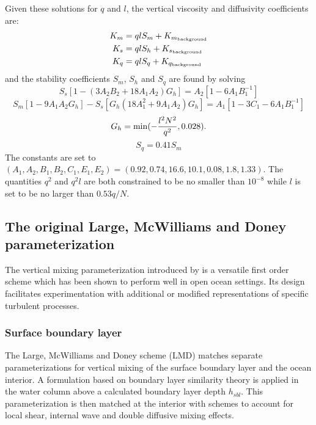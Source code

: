 Given these solutions for $q$ and $l$, the vertical viscosity and
diffusivity coefficients are:
\begin{align}
  K_m &= qlS_m + K_{m_{\rm background}} \\
  K_s &= qlS_h + K_{s_{\rm background}} \\
  K_q &= qlS_q + K_{q_{\rm background}}
\end{align}
and the stability coefficients $S_m$, $S_h$ and $S_q$ are found by
solving
\begin{equation}
  S_s \left[ 1 - (3A_2 B_2 + 18 A_1 A_2) G_h \right] =
  A_2 \left[ 1 - 6A_1 B_1^{-1} \right]
\end{equation}
\begin{equation}
  S_m \left[ 1 - 9A_1 A_2 G_h \right] - S_s \left[ G_h ( 18 A_1^2 +
  9A_1 A_2 ) G_h \right] =
  A_1 \left[ 1 - 3C_1 - 6A_1 B_1^{-1} \right]
\end{equation}
\begin{equation}
  G_h = \min ( -{l^2N^2 \over q^2}, 0.028 ).
\end{equation}
\begin{equation}
  S_q = 0.41 S_m
\end{equation}
The constants are set to $(A_1, A_2, B_1, B_2, C_1, E_1, E_2) = 
(0.92, 0.74, 16.6, 10.1, 0.08, 1.8, 1.33)$. The quantities $q^2$ and
$q^2l$ are both constrained to be no smaller than $10^{-8}$ while $l$
is set to be no larger than $0.53q/N$.
    
\subsection{The original Large, McWilliams and Doney parameterization}
\label{sec:origLMD}

The vertical mixing parameterization introduced by
\citet{Large94} is a versatile first order scheme which has
been shown to perform well in open ocean settings.  Its design
facilitates experimentation with additional or modified representations
of specific turbulent processes.

\subsubsection{Surface boundary layer}
The Large, McWilliams and Doney scheme (LMD)
matches separate parameterizations for vertical mixing
of the surface boundary layer and the ocean interior.  A formulation
based on boundary layer similarity theory is applied in the water
column above a calculated boundary layer depth $h_{sbl}$.  This
parameterization is then matched at the interior with schemes to
account for local shear, internal wave and double diffusive mixing
effects.  

